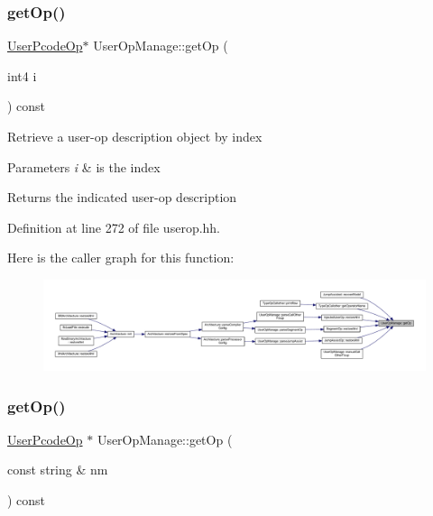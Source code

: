\subsubsection{\texorpdfstring{getOp()}{getOp()}\hspace{0.1cm}{\footnotesize\ttfamily [1/2]}}
{\footnotesize\ttfamily \mbox{\hyperlink{class_user_pcode_op}{User\+Pcode\+Op}}$\ast$ User\+Op\+Manage\+::get\+Op (\begin{DoxyParamCaption}\item[{int4}]{i }\end{DoxyParamCaption}) const\hspace{0.3cm}{\ttfamily [inline]}}

Retrieve a user-\/op description object by index 
\begin{DoxyParams}{Parameters}
{\em i} & is the index \\
\hline
\end{DoxyParams}
\begin{DoxyReturn}{Returns}
the indicated user-\/op description 
\end{DoxyReturn}


Definition at line 272 of file userop.\+hh.

Here is the caller graph for this function\+:
\nopagebreak
\begin{figure}[H]
\begin{center}
\leavevmode
\includegraphics[width=350pt]{class_user_op_manage_a20d645319fc3912640bec7113c11818d_icgraph}
\end{center}
\end{figure}
\mbox{\label{class_user_op_manage_a305893145a3e799d4d97936296698bfb}} 
\subsubsection{\texorpdfstring{getOp()}{getOp()}\hspace{0.1cm}{\footnotesize\ttfamily [2/2]}}
{\footnotesize\ttfamily \mbox{\hyperlink{class_user_pcode_op}{User\+Pcode\+Op}} $\ast$ User\+Op\+Manage\+::get\+Op (\begin{DoxyParamCaption}\item[{const string \&}]{nm }\end{DoxyParamCaption}) const}



